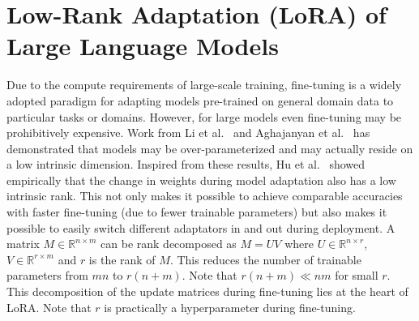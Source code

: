 \documentclass{article}
\newcommand{\R}{\mathbb{R}}
\begin{document}
\section{Low-Rank Adaptation (LoRA) of Large Language Models} \label{lora}
Due to the compute requirements of large-scale training, fine-tuning is a widely adopted paradigm for adapting models pre-trained on general domain data to particular tasks or domains. However, for large models even fine-tuning may be prohibitively expensive. Work from Li et al.~\cite{li2018measuring} and Aghajanyan et al.~\cite{aghajanyan2020intrinsic} has demonstrated that models may be over-parameterized and may actually reside on a low intrinsic dimension. Inspired from these results, Hu et al.~\cite{hu2022lora} showed empirically that the change in weights during model adaptation also has a low intrinsic rank. This not only makes it possible to achieve comparable accuracies with faster fine-tuning (due to fewer trainable parameters) but also makes it possible to easily switch different adaptators in and out during deployment. A matrix $M \in \R^{n \times m}$ can be rank decomposed as $M = UV$ where $U \in \R^{n \times r}$, $V \in \R^{r \times m}$ and $r$ is the rank of $M$. This reduces the number of trainable parameters from $mn$ to $r(n + m)$. Note that $r(n + m) \ll nm$ for small $r$. This decomposition of the update matrices during fine-tuning lies at the heart of LoRA. Note that $r$ is practically a hyperparameter during fine-tuning.
\end{document}
